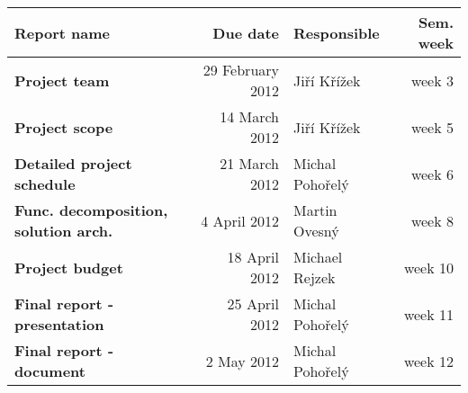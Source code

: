 \documentclass[12pt]{article}
\begin{document}
\begin{tabular}{|l|r|l|r|}
\hline
\bf{Report name} & \bf{Due date} & \bf{Responsible} & \bf{Sem. week} \\
\hline
\hline
{\bf Project team                } & 29 February 2012 & Jiří Křížek & week 3 \\
{\bf Project scope               } & 14 March 2012 & Jiří Křížek & week 5 \\
{\bf Detailed project schedule } & 21 March 2012 & Michal Pohořelý & week 6 \\
{\bf Func. decomposition, solution arch. } & 4 April 2012 & Martin Ovesný & week 8 \\
{\bf Project budget } & 18 April 2012 & Michael Rejzek & week 10 \\
{\bf Final report - presentation } & 25 April 2012 & Michal Pohořelý & week 11 \\
{\bf Final report - document     } & 2 May 2012 & Michal Pohořelý & week 12 \\
\hline
\end{tabular}
\end{document}
